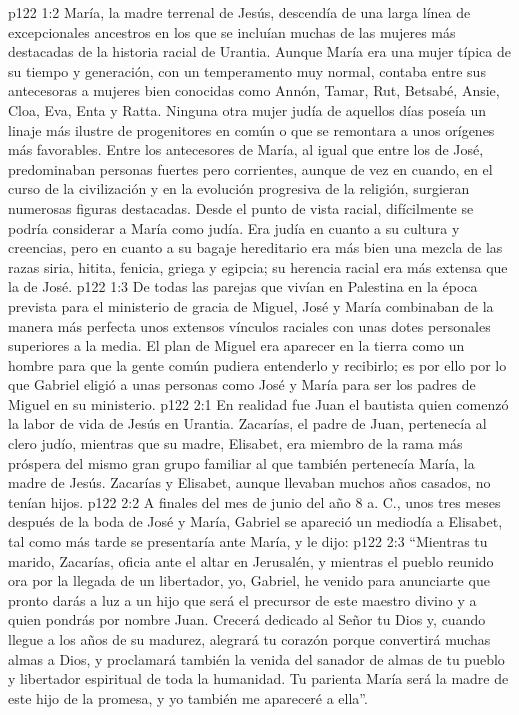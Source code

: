 \vs p122 1:2 María, la madre terrenal de Jesús, descendía de una larga línea de excepcionales ancestros en los que se incluían muchas de las mujeres más destacadas de la historia racial de Urantia. Aunque María era una mujer típica de su tiempo y generación, con un temperamento muy normal, contaba entre sus antecesoras a mujeres bien conocidas como Annón, Tamar, Rut, Betsabé, Ansie, Cloa, Eva, Enta y Ratta. Ninguna otra mujer judía de aquellos días poseía un linaje más ilustre de progenitores en común o que se remontara a unos orígenes más favorables. Entre los antecesores de María, al igual que entre los de José, predominaban personas fuertes pero corrientes, aunque de vez en cuando, en el curso de la civilización y en la evolución progresiva de la religión, surgieran numerosas figuras destacadas. Desde el punto de vista racial, difícilmente se podría considerar a María como judía. Era judía en cuanto a su cultura y creencias, pero en cuanto a su bagaje hereditario era más bien una mezcla de las razas siria, hitita, fenicia, griega y egipcia; su herencia racial era más extensa que la de José.
\vs p122 1:3 De todas las parejas que vivían en Palestina en la época prevista para el ministerio de gracia de Miguel, José y María combinaban de la manera más perfecta unos extensos vínculos raciales con unas dotes personales superiores a la media. El plan de Miguel era aparecer en la tierra como un hombre  para que la gente común pudiera entenderlo y recibirlo; es por ello por lo que Gabriel eligió a unas personas como José y María para ser los padres de Miguel en su ministerio.
\vs p122 2:1 En realidad fue Juan el bautista quien comenzó la labor de vida de Jesús en Urantia. Zacarías, el padre de Juan, pertenecía al clero judío, mientras que su madre, Elisabet, era miembro de la rama más próspera del mismo gran grupo familiar al que también pertenecía María, la madre de Jesús. Zacarías y Elisabet, aunque llevaban muchos años casados, no tenían hijos.
\vs p122 2:2 \pc A finales del mes de junio del año 8 a. C., unos tres meses después de la boda de José y María, Gabriel se apareció un mediodía a Elisabet, tal como más tarde se presentaría ante María, y le dijo:
\vs p122 2:3 “Mientras tu marido, Zacarías, oficia ante el altar en Jerusalén, y mientras el pueblo reunido ora por la llegada de un libertador, yo, Gabriel, he venido para anunciarte que pronto darás a luz a un hijo que será el precursor de este maestro divino y a quien pondrás por nombre Juan. Crecerá dedicado al Señor tu Dios y, cuando llegue a los años de su madurez, alegrará tu corazón porque convertirá muchas almas a Dios, y proclamará también la venida del sanador de almas de tu pueblo y libertador espiritual de toda la humanidad. Tu parienta María será la madre de este hijo de la promesa, y yo también me apareceré a ella”.
